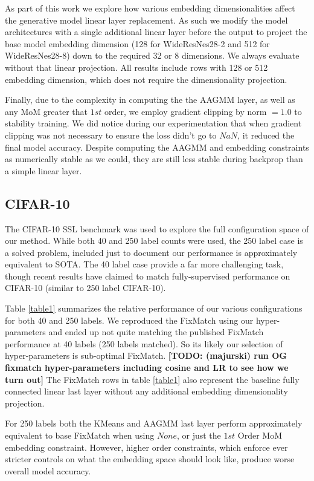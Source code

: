 \documentclass[10pt,twocolumn,letterpaper]{article}
\newcommand{\TODO}[1]{\textbf{\color{red}[TODO: #1]}}
\begin{document}
As part of this work we explore how various embedding dimensionalities affect the generative model linear layer replacement.
As such we modify the model architectures with a single additional linear layer before the output to project the base model embedding dimension (128 for WideResNes28-2 and 512 for WideResNes28-8) down to the required 32 or 8 dimensions.
We always evaluate without that linear projection.
All results include rows with 128 or 512 embedding dimension, which does not require the dimensionality projection.

Finally, due to the complexity in computing the the AAGMM layer, as well as any MoM greater that $1st$ order, we employ gradient clipping by norm $=1.0$ to stability training. 
We did notice during our experimentation that when gradient clipping was not necessary to ensure the loss didn't go to $NaN$, it reduced the final model accuracy.
Despite computing the AAGMM and embedding constraints as numerically stable as we could, they are still less stable during backprop than a simple linear layer.



\subsection{CIFAR-10}

The CIFAR-10 SSL benchmark was used to explore the full configuration space of our method.
While both 40 and 250 label counts were used, the 250 label case is a solved problem, included just to document our performance is approximately equivalent to SOTA. 
The 40 label case provide a far more challenging task, though recent results have claimed to match fully-supervised performance on CIFAR-10 (similar to 250 label CIFAR-10).

Table \ref{table1} summarizes the relative performance of our various configurations for both 40 and 250 labels.
We reproduced the FixMatch \cite{sohn2020fixmatch} using our hyper-parameters and ended up not quite matching the published FixMatch performance at 40 labels (250 labels matched). 
So its likely our selection of hyper-parameters is sub-optimal FixMatch.
\TODO {(majurski) run OG fixmatch hyper-parameters including cosine and LR to see how we turn out}
The FixMatch rows in table \ref{table1} also represent the baseline fully connected linear last layer without any additional embedding dimensionality projection.

For 250 labels both the KMeans and AAGMM last layer perform approximately equivalent to base FixMatch when using $None$, or just the $1st$ Order MoM embedding constraint.
However, higher order constraints, which enforce ever stricter controls on what the embedding space should look like, produce worse overall model accuracy.
\end{document}
